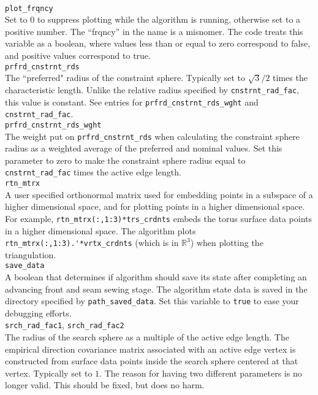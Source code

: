 \documentclass[11pt]{amsart}
\begin{document}
\\[\baselineskip]
\noindent
\verb+plot_frqncy+\\
\noindent
Set to $0$ to suppress plotting while the algorithm is running, otherwise set to a positive number.
The ``frqncy'' in the name is a misnomer. 
The code treats this variable as a boolean, where values less than or equal to zero correspond to false, and positive values correspond to true.
\\[\baselineskip]
\noindent
\verb+prfrd_cnstrnt_rds+\\
The ``preferred" radius of the constraint sphere. Typically set to $\sqrt{3}/2$ times the characteristic length.
Unlike the relative radius specified by \verb+cnstrnt_rad_fac+, this value is constant.
See entries for \verb+prfrd_cnstrnt_rds_wght+ and \verb+cnstrnt_rad_fac+.
\\[\baselineskip]
\noindent
\verb+prfrd_cnstrnt_rds_wght+\\
\noindent
The weight put on \verb+prfrd_cnstrnt_rds+ when calculating the constraint sphere radius as a weighted average of the preferred and nominal values.
Set this parameter to zero to make the constraint sphere radius equal to \verb+cnstrnt_rad_fac+ times the active edge length.
\\[\baselineskip]
\noindent
\verb+rtn_mtrx+\\
\noindent
A user specified orthonormal matrix used for embedding points in a subspace of a higher dimensional space, and for plotting points in a higher dimensional space.
For example, \verb+rtn_mtrx(:,1:3)*trs_crdnts+ embeds the torus surface data points in a higher dimensional space.
The algorithm plots \verb+rtn_mtrx(:,1:3).'*vrtx_crdnts+ (which is in $\mathbb{R}^3$) when plotting the triangulation.
\\[\baselineskip]
\noindent
\verb+save_data+\\
A boolean that determines if algorithm should save its state after completing an advancing front and seam sewing stage.
The algorithm state data is saved in the directory specified by \verb+path_saved_data+.
Set this variable to \verb+true+ to ease your debugging efforts.
\noindent
\\[\baselineskip]
\noindent
\verb+srch_rad_fac1+, \verb+srch_rad_fac2+\\
\noindent
The radius of the search sphere as a multiple of the active edge length.
The empirical direction covariance matrix associated with an active edge vertex is constructed from surface data points inside the search sphere centered at that vertex.
Typically set to $1$.
The reason for having two different parameters is no longer valid.
This should be fixed, but does no harm.
\end{document}
